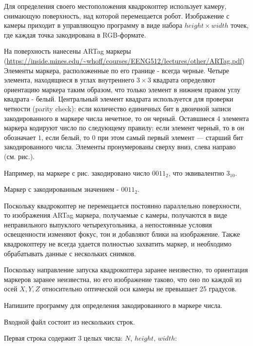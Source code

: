 
Для определения своего местоположения квадрокоптер использует камеру, снимающую поверхность, над которой перемещается робот. Изображение с камеры приходит в управляющую программу в виде набора $height \times width$ точек, где каждая точка закодирована в RGB-формате.


На поверхность нанесены ARTag маркеры (\url{https://inside.mines.edu/~whoff/courses/EENG512/lectures/other/ARTag.pdf}) 
Элементы маркера, расположенные по его границе - всегда черные. Четыре элемента, находящиеся в углах внутреннего $3\times 3$ квадрата определяют ориентацию маркера таким образом, что только элемент в нижнем правом углу квадрата - белый. Центральный элемент квадрата используется для проверки четности (parity check): если количество единичных бит в двоичной записи закодированного в маркере числа нечетное, то он черный. Оставшиеся $4$ элемента маркера кодируют число по следующему правилу: если элемент черный, то в он обозначает $1$, если белый, то $0$ при этом самый первый элемент --- старший бит закодированного числа. Элементы пронумерованы сверху вниз, слева направо (см. рис.).

Например, на маркере с рис. закодировано число $0011_2$, что эквивалентно $3_{10}$.


Маркер с закодированным значением - $0011_2$.

Поскольку квадрокоптер не перемещается постоянно параллельно поверхности, то изображения ARTag маркера, получаемые с камеры, получаются в виде неправильного выпуклого четырехугольника, а непостоянные условия освещенности изменяют фокус, тон и добавляют блики на изображение. Также квадрокоптеру не всегда удается полностью захватить маркер, и необходимо обрабатывать данные с нескольких снимков.

Поскольку направление запуска квадрокоптера заранее неизвестно, то ориентация маркеров заранее неизвестна, но его изображение таково, что оно по каждой из осей $X, Y, Z$ относительно оптической оси камеры не превышает 25 градусов.

Напишите программу для определения закодированного в маркере числа.


Входной файл состоит из нескольких строк.

Первая строка содержит 3 целых числа: $N$, $height$, $width$:

